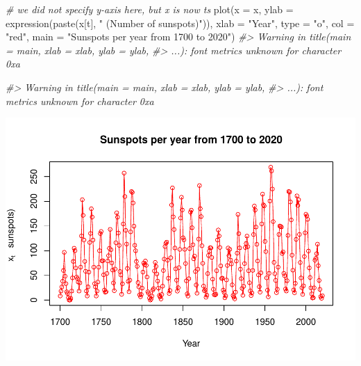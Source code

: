 \documentclass[
]{book}
\newenvironment{Shaded}{\begin{snugshade}}{\end{snugshade}}
\newcommand{\AttributeTok}[1]{\textcolor[rgb]{0.77,0.63,0.00}{#1}}
\newcommand{\CommentTok}[1]{\textcolor[rgb]{0.56,0.35,0.01}{\textit{#1}}}
\newcommand{\FunctionTok}[1]{\textcolor[rgb]{0.00,0.00,0.00}{#1}}
\newcommand{\NormalTok}[1]{#1}
\newcommand{\OtherTok}[1]{\textcolor[rgb]{0.56,0.35,0.01}{#1}}
\newcommand{\StringTok}[1]{\textcolor[rgb]{0.31,0.60,0.02}{#1}}
\begin{document}
\begin{Shaded}
\begin{Highlighting}[]
\CommentTok{\# we did not specify y{-}axis here, but x is now ts}
\FunctionTok{plot}\NormalTok{(}\AttributeTok{x =}\NormalTok{ x, }\AttributeTok{ylab =} \FunctionTok{expression}\NormalTok{(}\FunctionTok{paste}\NormalTok{(x[t], }\StringTok{" (Number of }
\StringTok{   sunspots)"}\NormalTok{)), }\AttributeTok{xlab =} \StringTok{"Year"}\NormalTok{, }\AttributeTok{type =} \StringTok{"o"}\NormalTok{, }\AttributeTok{col =} \StringTok{"red"}\NormalTok{, main }
   \OtherTok{=} \StringTok{"Sunspots per year from 1700 to 2020"}\NormalTok{)}
\CommentTok{\#\textgreater{} Warning in title(main = main, xlab = xlab, ylab = ylab,}
\CommentTok{\#\textgreater{} ...): font metrics unknown for character 0xa}

\CommentTok{\#\textgreater{} Warning in title(main = main, xlab = xlab, ylab = ylab,}
\CommentTok{\#\textgreater{} ...): font metrics unknown for character 0xa}
\end{Highlighting}
\end{Shaded}

\includegraphics{02-Time-Series-Basics_files/figure-latex/unnamed-chunk-24-1.pdf}

  
\end{document}
